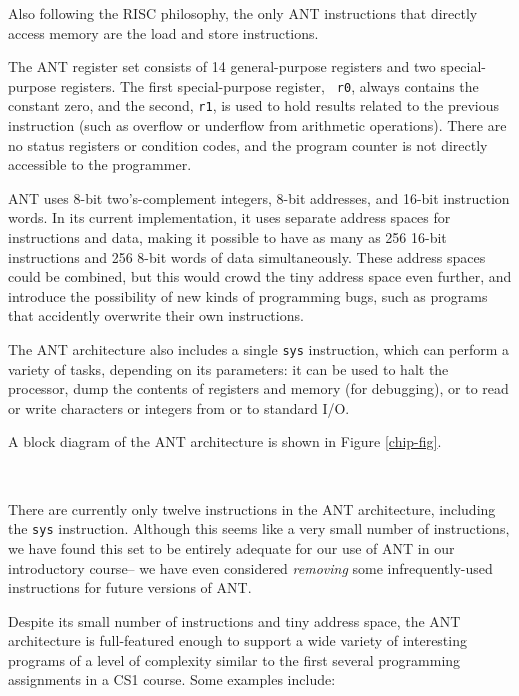 Also following the RISC philosophy, the only ANT instructions that
directly access memory are the load and store instructions.

The ANT register set consists of 14 general-purpose registers and two
special-purpose registers.  The first special-purpose register, {\tt
r0}, always contains the constant zero, and the second, {\tt r1}, is
used to hold results related to the previous instruction (such as
overflow or underflow from arithmetic operations).  There
are no status registers or condition codes, and the program
counter is not directly accessible to the programmer.

ANT uses 8-bit two's-complement integers, 8-bit addresses, and 16-bit
instruction words.  In its current implementation, it uses separate
address spaces for instructions and data, making it possible to have
as many as 256 16-bit instructions and 256 8-bit words of data
simultaneously.  These address spaces could be combined, but this
would crowd the tiny address space even further, and introduce the
possibility of new kinds of programming bugs, such as programs that
accidently overwrite their own instructions.

The ANT architecture also includes a single {\tt sys} instruction,
which can perform a variety of tasks, depending on its parameters:  it
can be used to halt the processor, dump the contents of registers and
memory (for debugging), or to read or write characters or integers from or to
standard I/O.

A block diagram of the ANT architecture is shown in Figure \ref{chip-fig}.

\begin{figure*}
\caption{\label{chip-fig} A block diagram of the ANT architecture. }
\vspace{5mm}
\centerline{\hbox{
}}
\vspace{3mm}
\end{figure*}

There are currently only twelve instructions in the ANT architecture,
including the {\tt sys} instruction.  Although this seems like a very
small number of instructions, we have found this set to be entirely adequate
for our use of ANT in our introductory course-- we have even
considered {\em removing} some infrequently-used instructions for
future versions of ANT.

Despite its small number of instructions and tiny address
space, the ANT architecture is full-featured enough to support a wide
variety of interesting programs of a level of complexity similar to
the first several programming assignments in a CS1 course.  Some
examples include:

